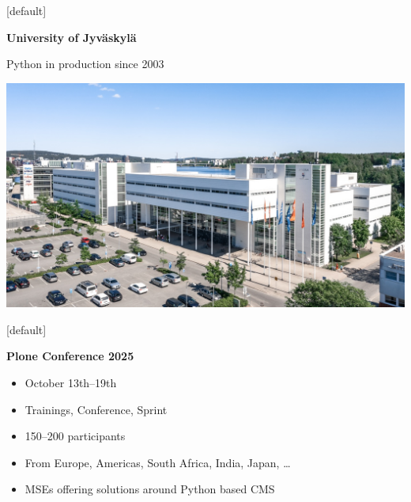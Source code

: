 \documentclass[12pt,aspectratio=169]{beamer}
\begin{document}
[default]
\begin{frame}
  \begin{minipage}{0.58\textwidth}
    \centering
    \huge \textbf{University of Jyväskylä}
    \par
    \vspace{0.5cm}
    \normalsize
    Python in production since 2003
  \end{minipage}
  \begin{minipage}{0.4\textwidth}
    \centering
    \vfill
    \includegraphics[height=\paperheight, trim=6cm 0cm 0cm 0cm, clip]{images/venue.jpg}
    \vfill
  \end{minipage}
\end{frame}


[default]
\begin{frame}
  \begin{minipage}{0.48\textwidth}
    \textbf{Plone Conference 2025}
    \begin{itemize}
      \item October 13th–19th
      \item Trainings, Conference, Sprint
      \item 150–200 participants
      \item From Europe, Americas, South Africa, India, Japan, \ldots
      \item MSEs offering solutions around Python based CMS
    \end{itemize}
  \end{minipage}
\end{frame}
\end{document}
